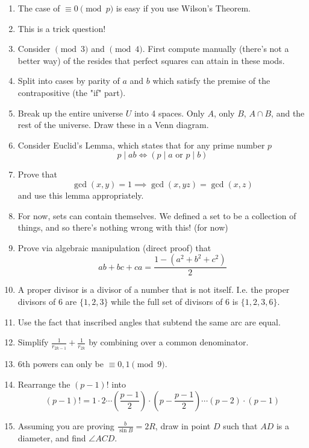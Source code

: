 \begin{enumerate}[label=\textbf{H\arabic*.}]
    \item The case of $\equiv 0 \pmod{p}$ is easy if you use Wilson's Theorem.
    \item This is a trick question!
    \item Consider $\pmod{3}$ and $\pmod{4}$. First compute manually (there's not a better way) of the resides that perfect squares can attain in these mods.
    \item Split into cases by parity of $a$ and $b$ which satisfy the premise of the contrapositive (the "if" part). 
    \item Break up the entire universe $U$ into 4 spaces. Only $A$, only $B$, $A \cap B$, and the rest of the universe. Draw these in a Venn diagram.
    \item Consider Euclid's Lemma, which states that for any prime number $p$
    \[
    p \mid ab \iff (p \mid a \text{ or } p \mid b)
    \]
    \item Prove that 
    \[
    \gcd(x, y) = 1 \implies \gcd(x, yz) = \gcd(x, z)
    \]
    and use this lemma appropriately. 
    \item For now, sets can contain themselves. We defined a set to be a collection of things, and so there's nothing wrong with this! (for now)
    \item Prove via algebraic manipulation (direct proof) that
    \[
    ab + bc + ca = \frac{1-(a^2+b^2+c^2)}{2}
    \]
    \item A proper divisor is a divisor of a number that is not itself. I.e. the proper divisors of $6$ are $\{1, 2, 3\}$ while the full set of divisors of $6$ is $\{1, 2, 3, 6\}$.
    \item Use the fact that inscribed angles that subtend the same arc are equal. 
    \item Simplify $\frac{1}{r_{2k-1}} + \frac{1}{r_{2k}}$ by combining over a common denominator.
    \item 6th powers can only be $\equiv 0, 1 \pmod{9}$.
    \item Rearrange the $(p-1)!$ into 
    \[
    (p-1)! = 1 \cdot 2 \cdots \left(\frac{p-1}{2}\right) \cdot \left(  p-\frac{p-1}{2} \right) \cdots (p-2) \cdot (p-1)
    \]
    \item Assuming you are proving $\frac{b}{\sin B} = 2R$, draw in point $D$ such that $AD$ is a diameter, and find $\angle ACD$. 
\end{enumerate}




